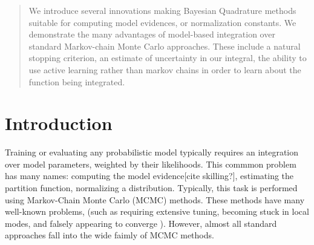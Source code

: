 \documentclass{article}
\begin{document}
 

\begin{abstract} 
We introduce several innovations making Bayesian Quadrature methods suitable for computing model evidences, or normalization constants.  We demonstrate the many advantages of model-based integration over standard Markov-chain Monte Carlo approaches.  These include a natural stopping criterion, an estimate of uncertainty in our integral, the ability to use active learning rather than markov chains in order to learn about the function being integrated.
\end{abstract} 

\section{Introduction}

Training or evaluating any probabilistic model typically requires an integration over model parameters, weighted by their likelihoods.  This commmon problem has many names:  computing the model evidence[cite skilling?], estimating the partition function, normalizing a distribution.  Typically, this task is performed using Markov-Chain Monte Carlo (MCMC) methods.  These methods have many well-known problems, (such as requiring extensive tuning, becoming stuck in local modes, and falsely appearing to converge \citep{NealMC}).  However, almost all standard approaches fall into the wide faimly of MCMC methods.
\end{document}
